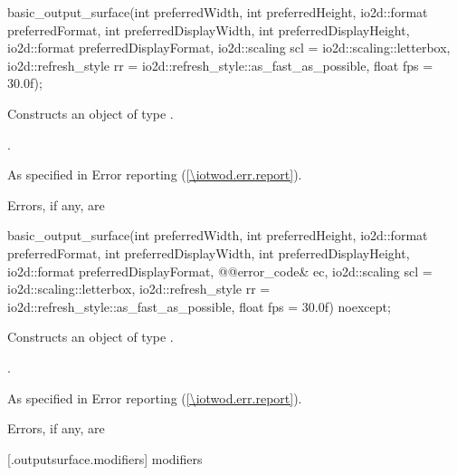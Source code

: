 %
\begin{itemdecl}
basic_output_surface(int preferredWidth, int preferredHeight,
  io2d::format preferredFormat, int preferredDisplayWidth,
  int preferredDisplayHeight, io2d::format preferredDisplayFormat,
  io2d::scaling scl = io2d::scaling::letterbox,
  io2d::refresh_style rr = io2d::refresh_style::as_fast_as_possible,
  float fps = 30.0f);
\end{itemdecl}
\begin{itemdescr}
\pnum
\effects Constructs an object of type .

\pnum
\postconditions {}.

\pnum
\throws As specified in Error reporting (\ref{\iotwod.err.report}).

\pnum
\errors Errors, if any, are 
\end{itemdescr}

%
\begin{itemdecl}
basic_output_surface(int preferredWidth, int preferredHeight,
  io2d::format preferredFormat, int preferredDisplayWidth,
  int preferredDisplayHeight, io2d::format preferredDisplayFormat,
  @\stdqualifier{}@error_code& ec, io2d::scaling scl = io2d::scaling::letterbox,
  io2d::refresh_style rr = io2d::refresh_style::as_fast_as_possible,
  float fps = 30.0f) noexcept;
\end{itemdecl}
\begin{itemdescr}
\pnum
\effects Constructs an object of type .

\pnum
\postconditions {}.

\pnum
\throws As specified in Error reporting (\ref{\iotwod.err.report}).

\pnum
\errors Errors, if any, are 
\end{itemdescr}


 [\iotwod.outputsurface.modifiers] { modifiers}

